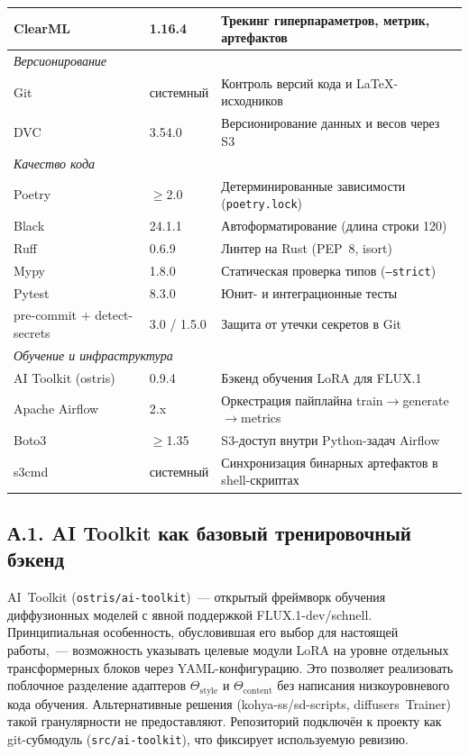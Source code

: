 \begin{table}[h]
\begin{tabular}{p{3.6cm} p{1.8cm} p{8.0cm}}
        ClearML~\cite{clearml2024} & 1.16.4 & Трекинг гиперпараметров, метрик, артефактов \\
        \midrule
        \multicolumn{3}{l}{\textit{Версионирование}} \\
        Git & системный & Контроль версий кода и LaTeX-исходников \\
        DVC~\cite{dvc2020} & 3.54.0 & Версионирование данных и весов через S3 \\
        \midrule
        \multicolumn{3}{l}{\textit{Качество кода}} \\
        Poetry & $\geq$2.0 & Детерминированные зависимости (\texttt{poetry.lock}) \\
        Black & 24.1.1 & Автоформатирование (длина строки 120) \\
        Ruff & 0.6.9 & Линтер на Rust (PEP~8, isort) \\
        Mypy & 1.8.0 & Статическая проверка типов (\texttt{--strict}) \\
        Pytest & 8.3.0 & Юнит- и интеграционные тесты \\
        pre-commit + detect-secrets & 3.0 / 1.5.0 & Защита от утечки секретов в Git \\
        \midrule
        \multicolumn{3}{l}{\textit{Обучение и инфраструктура}} \\
        AI Toolkit (ostris) & 0.9.4 & Бэкенд обучения LoRA для FLUX.1 \\
        Apache Airflow & 2.x & Оркестрация пайплайна train$\to$generate$\to$metrics \\
        Boto3 & $\geq$1.35 & S3-доступ внутри Python-задач Airflow \\
        s3cmd & системный & Синхронизация бинарных артефактов в shell-скриптах \\
        \bottomrule
    \end{tabular}
\end{table}

\subsection*{А.1. AI Toolkit как базовый тренировочный бэкенд}

AI~Toolkit (\texttt{ostris/ai-toolkit})~--- открытый фреймворк обучения
диффузионных моделей с явной поддержкой FLUX.1-dev/schnell. Принципиальная
особенность, обусловившая его выбор для настоящей работы,~--- возможность
указывать целевые модули LoRA на уровне отдельных трансформерных блоков
через YAML-конфигурацию. Это позволяет реализовать поблочное разделение
адаптеров $\Theta_\text{style}$ и $\Theta_\text{content}$ без написания
низкоуровневого кода обучения. Альтернативные решения (kohya-ss/sd-scripts,
diffusers~Trainer) такой гранулярности не предоставляют. Репозиторий
подключён к проекту как git-субмодуль (\texttt{src/ai-toolkit}), что
фиксирует используемую ревизию.

